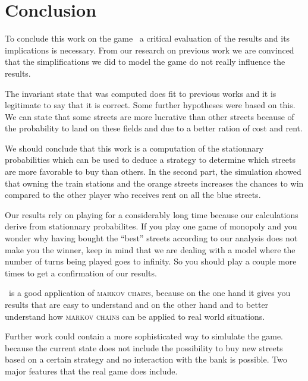 \section{Conclusion} %
\label{sec:conclusion}

To conclude this work on the game \monopoly~a critical evaluation of the results and its 
implications is necessary. From our research on previous work we are convinced that the 
simplifications we did to model the game do not really influence the results. 

The invariant state that was computed does fit to previous works and it is legitimate to say 
that it is correct. Some further hypotheses were based on this. 
We can state that some streets are more lucrative than other streets because of the 
probability to land on these fields and due to a better ration of cost and rent.

We should conclude that this work is a computation of the stationnary probabilities which can 
be used to deduce a strategy to determine which streets are more favorable to buy than others.
In the second part, the simulation showed that owning the train stations and the orange streets 
increases the chances to win compared to the other player who receives rent on all the blue 
streets. 

Our results rely on playing for a considerably long time because our calculations derive from 
stationnary probabilites. If you play one game of monopoly and you wonder why having bought the ``best'' 
streets according to our analysis does not make you the winner, keep in mind that we are dealing 
with a model where the number of turns being played goes to infinity. So you should play a couple 
more times to get a confirmation of our results.

\monopoly~is a good application of \textsc{markov chains}, because on the one hand it gives you results
that are easy to understand and on the other hand and to better
understand how \textsc{markov chains} can be applied to real world situations.

Further work could contain a more sophisticated way to simlulate the game. because the current state
does not include the possibility to buy new streets based on a certain strategy and no interaction
with the bank is possible. Two major features that the real game does include.

